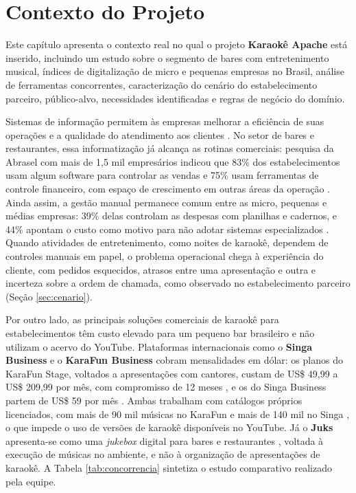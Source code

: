 \chapter{Contexto do Projeto} \label{cap:contexto}

Este capítulo apresenta o contexto real no qual o projeto \textbf{Karaokê Apache} está inserido, incluindo um estudo sobre o segmento de bares com entretenimento musical, índices de digitalização de micro e pequenas empresas no Brasil, análise de ferramentas concorrentes, caracterização do cenário do estabelecimento parceiro, público-alvo, necessidades identificadas e regras de negócio do domínio.

Sistemas de informação permitem às empresas melhorar a eficiência de suas operações e a qualidade do atendimento aos clientes \cite{obrien2013}. No setor de bares e restaurantes, essa informatização já alcança as rotinas comerciais: pesquisa da Abrasel com mais de 1,5 mil empresários indicou que 83\% dos estabelecimentos usam algum software para controlar as vendas e 75\% usam ferramentas de controle financeiro, com espaço de crescimento em outras áreas da operação \cite{jornaldocomercio2023}. Ainda assim, a gestão manual permanece comum entre as micro, pequenas e médias empresas: 39\% delas controlam as despesas com planilhas e cadernos, e 44\% apontam o custo como motivo para não adotar sistemas especializados \cite{folhape2025}. Quando atividades de entretenimento, como noites de karaokê, dependem de controles manuais em papel, o problema operacional chega à experiência do cliente, com pedidos esquecidos, atrasos entre uma apresentação e outra e incerteza sobre a ordem de chamada, como observado no estabelecimento parceiro (Seção \ref{sec:cenario}).

Por outro lado, as principais soluções comerciais de karaokê para estabelecimentos têm custo elevado para um pequeno bar brasileiro e não utilizam o acervo do YouTube. Plataformas internacionais como o \textbf{Singa Business} \cite{singa2026} e o \textbf{KaraFun Business} \cite{karafun2026} cobram mensalidades em dólar: os planos do KaraFun Stage, voltados a apresentações com cantores, custam de US\$ 49,99 a US\$ 209,99 por mês, com compromisso de 12 meses \cite{karafunstage2026}, e os do Singa Business partem de US\$ 59 por mês \cite{singablog2026}. Ambas trabalham com catálogos próprios licenciados, com mais de 90 mil músicas no KaraFun e mais de 140 mil no Singa \cite{karafun2026,singablog2026}, o que impede o uso de versões de karaokê disponíveis no YouTube. Já o \textbf{Juks} apresenta-se como uma \textit{jukebox} digital para bares e restaurantes \cite{juks2026}, voltada à execução de músicas no ambiente, e não à organização de apresentações de karaokê. A Tabela \ref{tab:concorrencia} sintetiza o estudo comparativo realizado pela equipe.

